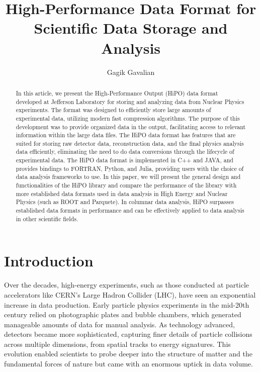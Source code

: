 \documentclass[preprint,12pt]{elsarticle}
\title{High-Performance Data Format for Scientific Data Storage and Analysis}
\author[1]{Gagik Gavalian \orcidlink{0000-0002-6738-5457}}
\begin{document}
\begin{abstract}
In this article, we present the High-Performance Output (HiPO) data format developed at Jefferson Laboratory for 
storing and analyzing data from Nuclear Physics experiments. The format was designed to efficiently store large
amounts of experimental data, utilizing modern fast compression algorithms. The purpose of this development was 
to provide organized data in the output, facilitating access to relevant information within the large data files. The HiPO
data format has features that are suited for storing raw detector data, reconstruction data, and the final physics analysis 
data efficiently, eliminating the need to do data conversions through the lifecycle of experimental data. The HiPO data format
is implemented in C++ and JAVA, and provides bindings to FORTRAN, Python, and Julia, providing users with the choice of data 
analysis frameworks to use.
In this paper, we will present the general design and functionalities of the HiPO library and compare the performance of the library with
 more established data formats used in data analysis in High Energy and Nuclear Physics (such as ROOT and Parquete). In columnar data analysis, HiPO surpasses established data formats in performance and can be effectively applied to data analysis in other scientific fields.

\end{abstract}
\maketitle

\section{Introduction}
\label{section-introduction}

Over the decades, high-energy experiments, such as those conducted at particle accelerators like CERN’s Large Hadron Collider (LHC), have seen an exponential increase in data production. Early particle physics experiments in the mid-20th century relied on photographic plates and bubble chambers, which generated manageable amounts of data for manual analysis. As technology advanced, detectors became more sophisticated, capturing finer details of particle collisions across multiple dimensions, from spatial tracks to energy signatures. This evolution enabled scientists to probe deeper into the structure of matter and the fundamental forces of nature but came with an enormous uptick in data volume.
\end{document}
